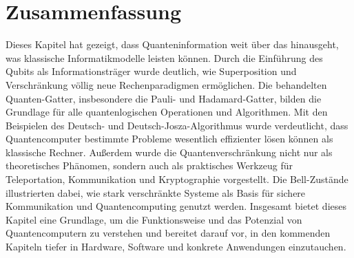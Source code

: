 \section{Zusammenfassung}
Dieses Kapitel hat gezeigt, dass Quanteninformation weit über das hinausgeht, was klassische Informatikmodelle leisten können. Durch die Einführung des Qubits als Informationsträger wurde deutlich, wie Superposition und Verschränkung völlig neue Rechenparadigmen ermöglichen. Die behandelten Quanten-Gatter, insbesondere die Pauli- und Hadamard-Gatter, bilden die Grundlage für alle quantenlogischen Operationen und Algorithmen. Mit den Beispielen des Deutsch- und Deutsch-Josza-Algorithmus wurde verdeutlicht, dass Quantencomputer bestimmte Probleme wesentlich effizienter lösen können als klassische Rechner. Außerdem wurde die Quantenverschränkung nicht nur als theoretisches Phänomen, sondern auch als praktisches Werkzeug für Teleportation, Kommunikation und Kryptographie vorgestellt. Die Bell-Zustände illustrierten dabei, wie stark verschränkte Systeme als Basis für sichere Kommunikation und Quantencomputing genutzt werden. Insgesamt bietet dieses Kapitel eine Grundlage, um die Funktionsweise und das Potenzial von Quantencomputern zu verstehen und bereitet darauf vor, in den kommenden Kapiteln tiefer in Hardware, Software und konkrete Anwendungen einzutauchen.

\printbibliography
